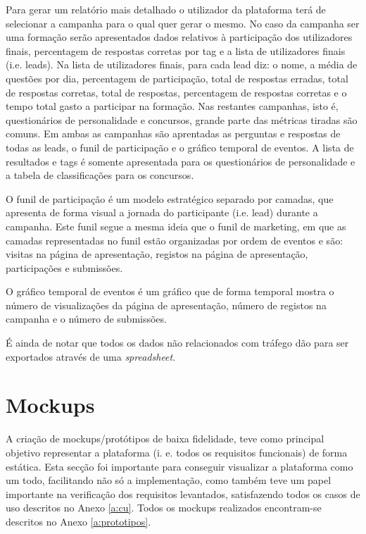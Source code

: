 Para gerar um relatório mais detalhado o utilizador da plataforma terá de selecionar a campanha para o qual quer gerar o mesmo. No caso da campanha ser uma formação serão apresentados dados relativos à participação dos utilizadores finais, percentagem de respostas corretas por tag e a lista de utilizadores finais (i.e. leads). Na lista de utilizadores finais, para cada lead diz: o nome, a média de questões por dia, percentagem de participação, total de respostas erradas, total de respostas corretas, total de respostas, percentagem de respostas corretas e o tempo total gasto a participar na formação. 
Nas restantes campanhas, isto é, questionários de personalidade e concursos, grande parte das métricas tiradas são comuns. Em ambas as campanhas são aprentadas as perguntas e respostas de todas as leads, o funil de participação e o gráfico temporal de eventos. A lista de resultados e tags é somente apresentada para os questionários de personalidade e a tabela de classificações para os concursos. 

O funil de participação é um modelo estratégico separado por camadas, que apresenta de forma visual a jornada do participante (i.e. lead) durante a campanha. Este funil segue a mesma ideia que o funil de marketing\cite{f8}\cite{f9}, em que as camadas representadas no funil estão organizadas por ordem de eventos e são: visitas na página de apresentação, registos na página de apresentação, participações e submissões.

O gráfico temporal de eventos é um gráfico que de forma temporal mostra o número de visualizações da página de apresentação, número de registos na campanha e o número de submissões.

É ainda de notar que todos os dados não relacionados com tráfego dão para ser exportados através de uma \textit{spreadsheet}.


\section{Mockups}
\label{prototipagem}

A criação de mockups/protótipos de baixa fidelidade, teve como principal objetivo representar a plataforma (i. e. todos os requisitos funcionais) de forma estática. Esta secção foi importante para conseguir visualizar a plataforma como um todo, facilitando não só a implementação, como também teve um papel importante na verificação dos requisitos levantados, satisfazendo todos os casos de uso descritos no Anexo \ref{a:cu}. Todos os mockups realizados encontram-se descritos no Anexo \ref{a:prototipos}.

